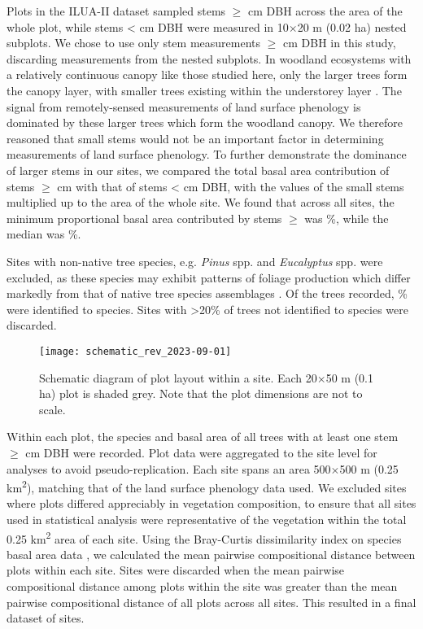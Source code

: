 \documentclass[11pt,a4paper]{article}
\begin{document}
Plots in the ILUA-II dataset sampled stems $\geq$\stemSize{} cm DBH across the
area of the whole plot, while stems <\stemSize{} cm DBH were measured in
10$\times$20 m (0.02 ha) nested subplots. We chose to use only stem
measurements $\geq$\stemSize{} cm DBH in this study, discarding measurements
from the nested subplots. In woodland ecosystems with a relatively continuous
canopy like those studied here, only the larger trees form the canopy layer,
with smaller trees existing within the understorey layer \citep{Chidumayo2001}.
The signal from remotely-sensed measurements of land surface phenology is
dominated by these larger trees which form the woodland canopy. We therefore
reasoned that small stems would not be an important factor in determining
measurements of land surface phenology. To further demonstrate the dominance of
larger stems in our sites, we compared the total basal area contribution of
stems $\geq$\stemSize{} cm with that of stems <\stemSize{} cm DBH, with the
values of the small stems multiplied up to the area of the whole site. We found
that across all sites, the minimum proportional basal area contributed by stems
$\geq$\stemSize{} was \minPropBABig{}\%, while the median was
\medianPropBABig{}\%.

Sites with non-native tree species, e.g. \textit{Pinus} spp. and
\textit{Eucalyptus} spp. were excluded, as these species may exhibit patterns
of foliage production which differ markedly from that of native tree species
assemblages \citep{Broadhead2003}. Of the \nTrees{} trees recorded,
\perSpID{}\% were identified to species. Sites with >20\% of trees not
identified to species were discarded.

\begin{figure}[H]
\centering
	\texttt{[image: schematic\_rev\_2023-09-01]}
	\caption{Schematic diagram of plot layout within a site. Each 20$\times$50
		m (0.1 ha) plot is shaded grey. Note that the plot dimensions are not to
		scale.}
	\label{schematic}
\end{figure}

Within each plot, the species and basal area of all trees with at least one
stem $\geq$\stemSize{} cm DBH were recorded. Plot data were aggregated to the
site level for analyses to avoid pseudo-replication. Each site spans an area
500$\times$500 m (0.25 km\textsuperscript{2}), matching that of the land
surface phenology data used. We excluded sites where plots differed appreciably
in vegetation composition, to ensure that all sites used in statistical
analysis were representative of the vegetation within the total 0.25
km\textsuperscript{2} area of each site. Using the Bray-Curtis dissimilarity
index on species basal area data \citep{Faith1987}, we calculated the mean
pairwise compositional distance between plots within each site. Sites were
discarded when the mean pairwise compositional distance among plots within the
site was greater than the mean pairwise compositional distance of all plots
across all sites. This resulted in a final dataset of \plotDistN{} sites.
\end{document}
